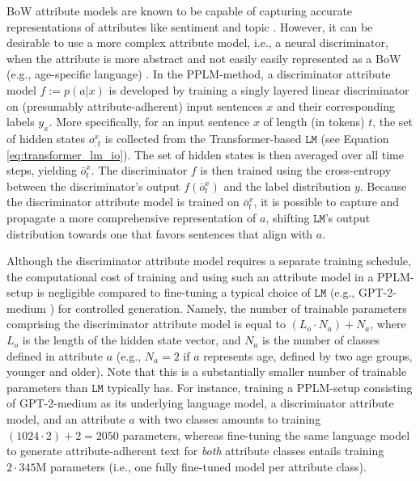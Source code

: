 BoW attribute models are known to be capable of capturing accurate representations of attributes like sentiment and topic \citep{li-etal-2018-delete}.
However, it can be desirable to use a more complex attribute model, i.e., a neural discriminator, when the attribute is more abstract and not easily easily represented as a BoW (e.g., age-specific language) \citep{dathathri2019plug}.
In the PPLM-method, a discriminator attribute model $f := p(a | x)$ is developed by training a singly layered linear discriminator on (presumably attribute-adherent) input sentences $x$ and their corresponding labels $y_x$. More specifically, for an input sentence $x$ of length (in tokens) $t$, the set of hidden states $o_{:t}^{x}$ is collected from the Transformer-based $\texttt{LM}$ (see Equation \ref{eq:transformer_lm_io}).
The set of hidden states is then averaged over all time steps, yielding $\bar{o}_t^x$.
The discriminator $f$ is then trained using the cross-entropy between the discriminator's output $f(\bar{o}_t^x)$ and the label distribution $y$. Because the discriminator attribute model is trained on $\bar{o}_t^x$, it is possible to capture and propagate a more comprehensive representation of $a$, shifting $\texttt{LM}$'s output distribution towards one that favors sentences that align with $a$.

Although the discriminator attribute model requires a separate training schedule, the computational cost of training and using such an attribute model in a PPLM-setup is negligible compared to fine-tuning a typical choice of $\texttt{LM}$ (e.g., GPT-2-medium \citep{radford2019language}) for controlled generation. Namely, the number of trainable parameters comprising the discriminator attribute model is equal to $(L_o \cdot N_a) + N_a$, where $L_o$ is the length of the hidden state vector, and $N_a$ is the number of classes defined in attribute $a$ (e.g., $N_a = 2$ if $a$ represents age, defined by two age groups, younger and older). Note that this is a substantially smaller number of trainable parameters than $\texttt{LM}$ typically has.
For instance, training a PPLM-setup consisting of GPT-2-medium as its underlying language model, a discriminator attribute model, and an attribute $a$ with two classes amounts to training $(1024 \cdot 2) + 2 = 2050$ parameters, whereas fine-tuning the same language model to generate attribute-adherent text for \textit{both} attribute classes entails training $2 \cdot 345\text{M}$ parameters (i.e., one fully fine-tuned model per attribute class).

